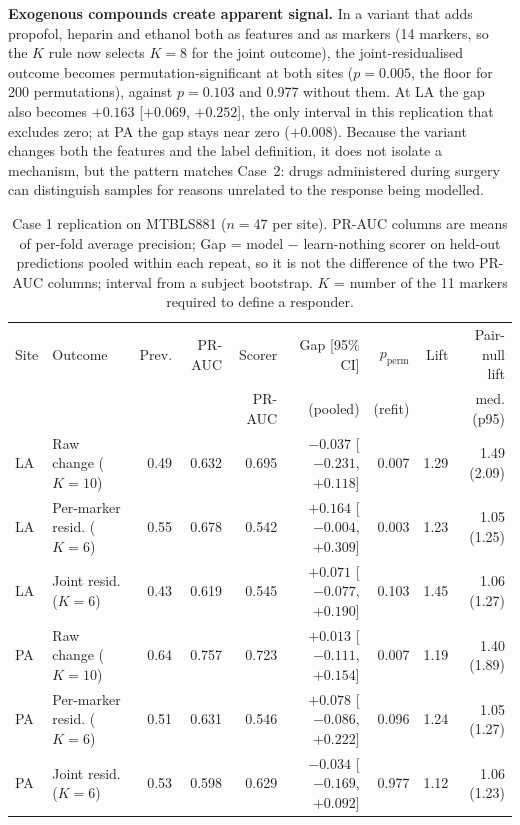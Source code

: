 \documentclass[conference]{IEEEtran}
\newcommand{\verified}[1]{#1}  %
\begin{document}
\textbf{Exogenous compounds create apparent signal.} In a variant that adds
propofol, heparin and ethanol both as features and as markers (14 markers,
so the $K$ rule now selects $K=8$ for the joint outcome), the
joint-residualised outcome becomes permutation-significant at both sites
($p=\verified{0.005}$, the floor for 200 permutations), against
$p=\verified{0.103}$ and \verified{0.977} without them. At LA the gap also
becomes \verified{$+0.163$} [\verified{$+0.069$}, \verified{$+0.252$}], the
only interval in this replication that excludes zero; at PA the gap stays
near zero (\verified{$+0.008$}). Because the variant changes both the
features and the label definition, it does not isolate a mechanism, but the
pattern matches Case~2: drugs administered during surgery can distinguish
samples for reasons unrelated to the response being modelled.

\begin{table}[t]
\centering
\caption{Case 1 replication on MTBLS881 ($n=47$ per site). PR-AUC columns are
means of per-fold average precision; Gap = model $-$ learn-nothing scorer on
held-out predictions pooled within each repeat, so it is not the difference
of the two PR-AUC columns; interval from a subject bootstrap. $K$ = number of
the 11 markers required to define a responder.}
\label{tab:case1b}
\footnotesize
\begin{tabular}{llrrrrrrr}
\toprule
Site & Outcome & Prev. & PR-AUC & Scorer & Gap [95\% CI] & $p_{\mathrm{perm}}$ & Lift & Pair-null lift \\
 & & & & PR-AUC & (pooled) & (refit) & & med. (p95) \\
\midrule
LA & Raw change ($K{=}10$) & 0.49 & 0.632 & 0.695 & $-0.037$ [$-0.231$, $+0.118$] & 0.007 & 1.29 & 1.49 (2.09) \\
LA & Per-marker resid. ($K{=}6$) & 0.55 & 0.678 & 0.542 & $+0.164$ [$-0.004$, $+0.309$] & 0.003 & 1.23 & 1.05 (1.25) \\
LA & Joint resid. ($K{=}6$) & 0.43 & 0.619 & 0.545 & $+0.071$ [$-0.077$, $+0.190$] & 0.103 & 1.45 & 1.06 (1.27) \\
\midrule
PA & Raw change ($K{=}10$) & 0.64 & 0.757 & 0.723 & $+0.013$ [$-0.111$, $+0.154$] & 0.007 & 1.19 & 1.40 (1.89) \\
PA & Per-marker resid. ($K{=}6$) & 0.51 & 0.631 & 0.546 & $+0.078$ [$-0.086$, $+0.222$] & 0.096 & 1.24 & 1.05 (1.27) \\
PA & Joint resid. ($K{=}6$) & 0.53 & 0.598 & 0.629 & $-0.034$ [$-0.169$, $+0.092$] & 0.977 & 1.12 & 1.06 (1.23) \\
\bottomrule
\end{tabular}
\end{table}
\end{document}
